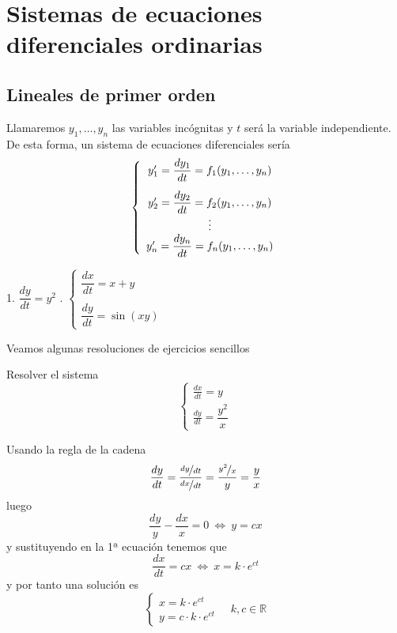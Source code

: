 \chapter{Sistemas de ecuaciones diferenciales ordinarias}
\section{Lineales de primer orden}
Llamaremos $y_1, \ldots, y_n$  las variables incógnitas y $t$ será la variable independiente. De esta forma, un sistema de ecuaciones diferenciales sería
$$\left\{ \begin{array}{c}
        \vspace{3mm} y'_1=\dfrac{dy_1}{dt}=f_1(y_1, \ldots, y_n)  \\
   y'_2=\dfrac{dy_2}{dt}=f_2(y_1, \ldots, y_n) \\
     \vdots \\
     y'_n=\dfrac{dy_n}{dt}=f_n(y_1, \ldots, y_n) 
\end{array} \right.$$
\begin{eje}\:
\begin{center}
        1. $\dfrac{dy}{dt}=y^2$ . $\left\{ \begin{array}{l}
             \dfrac{dx}{dt}=x+y  \\
             \\
             \dfrac{dy}{dt}=\sin(xy) 
        \end{array} \right.$
\end{center}
\end{eje}
Veamos algunas resoluciones de ejercicios sencillos 
\begin{ejer}[\textbf{35.a}] Resolver el sistema
    $$\left\{ \begin{array}{ll}
         \frac{dx}{dt}=y  \\
         \frac{dy}{dt}=\dfrac{y^2}{x} 
    \end{array}\right.$$
\end{ejer}\begin{sol}
    Usando la regla de la cadena
    $$\dfrac{dy}{dt}=\dfrac{\nicefrac{dy}{dt}}{\nicefrac{dx}{dt}}=\dfrac{\nicefrac{y^2}{x}}{y}=\dfrac{y}{x}$$
    luego 
    $$\dfrac{dy}{y}-\dfrac{dx}{x}=0 \: \iff \: y=cx$$
    y sustituyendo en la 1ª ecuación tenemos que 
    $$\dfrac{dx}{dt}=cx \: \iff \: x=k\cdot e^{ct}$$
    y por tanto una solución es
    $$\left\{ \begin{array}{l}
         x=k \cdot e^{ct}  \\
         y=c\cdot k \cdot e^{ct} 
    \end{array}\right. \quad k,c \in \mathbb R$$
\end{sol}
